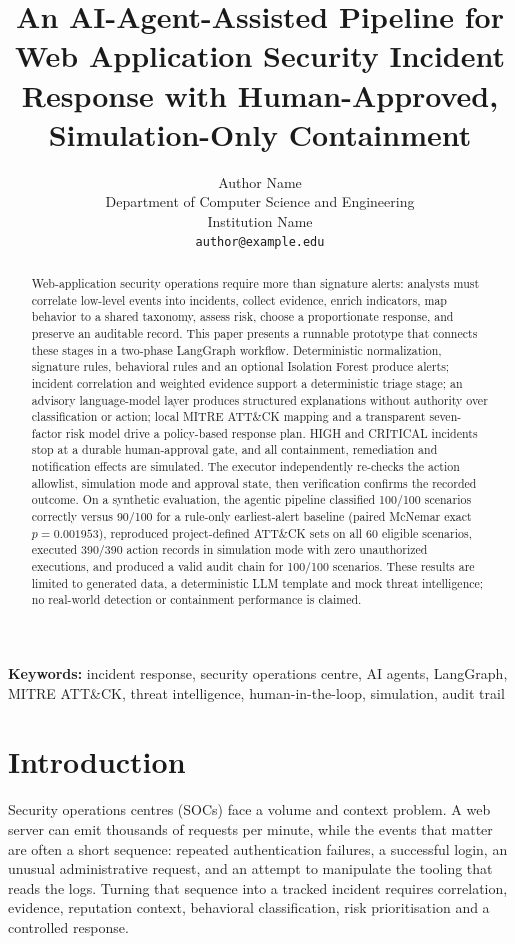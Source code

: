 \documentclass[10pt,twocolumn]{article}
\title{An AI-Agent-Assisted Pipeline for Web Application Security Incident Response with Human-Approved, Simulation-Only Containment}
\author{Author Name\\
Department of Computer Science and Engineering\\
Institution Name\\
\texttt{author@example.edu}}
\date{}
\begin{document}
\maketitle

\begin{abstract}
Web-application security operations require more than signature alerts: analysts must correlate low-level events into incidents, collect evidence, enrich indicators, map behavior to a shared taxonomy, assess risk, choose a proportionate response, and preserve an auditable record. This paper presents a runnable prototype that connects these stages in a two-phase LangGraph workflow. Deterministic normalization, signature rules, behavioral rules and an optional Isolation Forest produce alerts; incident correlation and weighted evidence support a deterministic triage stage; an advisory language-model layer produces structured explanations without authority over classification or action; local MITRE ATT\&CK mapping and a transparent seven-factor risk model drive a policy-based response plan. HIGH and CRITICAL incidents stop at a durable human-approval gate, and all containment, remediation and notification effects are simulated. The executor independently re-checks the action allowlist, simulation mode and approval state, then verification confirms the recorded outcome. On a synthetic evaluation, the agentic pipeline classified 100/100 scenarios correctly versus 90/100 for a rule-only earliest-alert baseline (paired McNemar exact $p=0.001953$), reproduced project-defined ATT\&CK sets on all 60 eligible scenarios, executed 390/390 action records in simulation mode with zero unauthorized executions, and produced a valid audit chain for 100/100 scenarios. These results are limited to generated data, a deterministic LLM template and mock threat intelligence; no real-world detection or containment performance is claimed.
\end{abstract}

\noindent\textbf{Keywords:} incident response, security operations centre, AI agents, LangGraph, MITRE ATT\&CK, threat intelligence, human-in-the-loop, simulation, audit trail

\section{Introduction}

Security operations centres (SOCs) face a volume and context problem. A web server can emit thousands of requests per minute, while the events that matter are often a short sequence: repeated authentication failures, a successful login, an unusual administrative request, and an attempt to manipulate the tooling that reads the logs. Turning that sequence into a tracked incident requires correlation, evidence, reputation context, behavioral classification, risk prioritisation and a controlled response.
\end{document}
